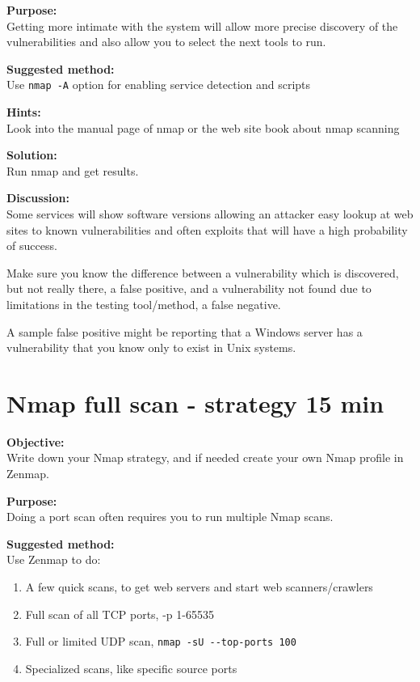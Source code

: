 \documentclass[a4paper,11pt,notitlepage]{report}
\begin{document}
{\bf Purpose:}\\
Getting more intimate with the system will allow more precise discovery of the vulnerabilities and also allow you to select the next tools to run.

{\bf Suggested method:}\\
Use \verb+nmap -A+ option for enabling service detection and scripts

{\bf Hints:} \\
Look into the manual page of nmap or the web site book about nmap scanning

{\bf Solution:}\\
Run nmap and get results.

{\bf Discussion:}\\
Some services will show software versions allowing an attacker easy lookup at web sites to known vulnerabilities and often exploits that will have a high probability of success.

Make sure you know the difference between a vulnerability which is discovered, but not really there, a false positive, and a vulnerability not found due to limitations in the testing tool/method, a false negative.

A sample false positive might be reporting that a Windows server has a vulnerability that you know only to exist in Unix systems.


\chapter{Nmap full scan - strategy 15 min}
\label{ex:nmap-strategy}


{\bf Objective:} \\
Write down your Nmap strategy, and if needed create your own Nmap profile in Zenmap.


{\bf Purpose:}\\
Doing a port scan often requires you to run multiple Nmap scans.


{\bf Suggested method:}\\
Use Zenmap to do:
\begin{enumerate}
\item A few quick scans, to get web servers and start web scanners/crawlers
\item Full scan of all TCP ports, -p 1-65535
\item Full or limited UDP scan, \verb+nmap -sU --top-ports 100+
\item Specialized scans, like specific source ports
\end{enumerate}
\end{document}
